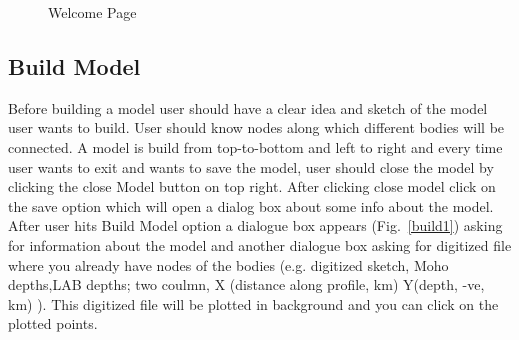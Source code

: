 \documentclass[14pt]{article}
\begin{document}
\begin{figure}
\caption{Welcome Page}
\label{welcome}
\end{figure}

\subsection{Build Model}
Before building a model user should have a clear idea and sketch of the model user wants to build. User should know nodes along which different bodies will be connected. A model is build from top-to-bottom and left to right and every time user wants to exit and wants to save the model, user should close the model by clicking the close Model button on top right. After clicking close model click on the save option which will open a dialog box about some info about the model.\\
After user hits Build Model option a dialogue box appears (Fig.~\ref{build1})
asking for information about the model and another dialogue box asking for digitized file where you already have nodes of the bodies (e.g. digitized sketch, Moho depths,LAB depths; two coulmn, X (distance along profile, km) Y(depth, -ve, km) ). This digitized file will be plotted in background and you can click on the plotted points. 
\end{document}
